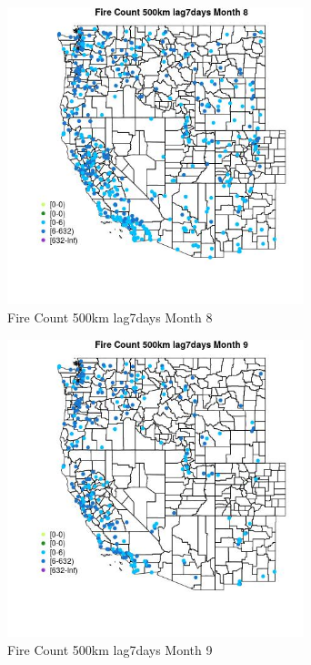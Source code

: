 \begin{figure} 
\centering  
\includegraphics[width=0.77\textwidth]{Code_Outputs/Report_ML_input_PM25_Step4_part_e_de_duplicated_aves_compiled_2019-05-18wNAs_MapObsMo8Fire_Count_500km_lag7days.jpg} 
\caption{\label{fig:Report_ML_input_PM25_Step4_part_e_de_duplicated_aves_compiled_2019-05-18wNAsMapObsMo8Fire_Count_500km_lag7days}Fire Count 500km lag7days Month 8} 
\end{figure} 
 

\begin{figure} 
\centering  
\includegraphics[width=0.77\textwidth]{Code_Outputs/Report_ML_input_PM25_Step4_part_e_de_duplicated_aves_compiled_2019-05-18wNAs_MapObsMo9Fire_Count_500km_lag7days.jpg} 
\caption{\label{fig:Report_ML_input_PM25_Step4_part_e_de_duplicated_aves_compiled_2019-05-18wNAsMapObsMo9Fire_Count_500km_lag7days}Fire Count 500km lag7days Month 9} 
\end{figure} 
 

